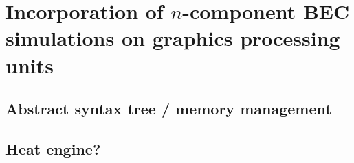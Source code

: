 \chapter{Incorporation of $n$-component BEC simulations on graphics processing units}
\label{ch-multicomp}

\section{Abstract syntax tree / memory management}
\section{Heat engine?}

